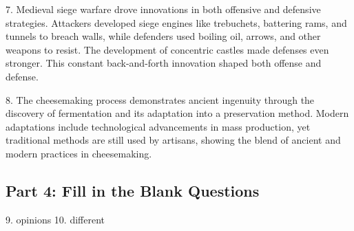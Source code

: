 \documentclass[12pt]{article}
\begin{document}
7. Medieval siege warfare drove innovations in both offensive and defensive strategies. Attackers developed siege engines like trebuchets, battering rams, and tunnels to breach walls, while defenders used boiling oil, arrows, and other weapons to resist. The development of concentric castles made defenses even stronger. This constant back-and-forth innovation shaped both offense and defense.

8. The cheesemaking process demonstrates ancient ingenuity through the discovery of fermentation and its adaptation into a preservation method. Modern adaptations include technological advancements in mass production, yet traditional methods are still used by artisans, showing the blend of ancient and modern practices in cheesemaking.

\subsection*{Part 4: Fill in the Blank Questions}

9. opinions  
10. different
\end{document}
